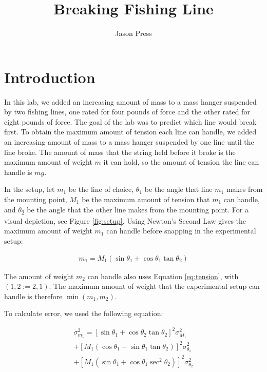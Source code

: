 \documentclass[12pt]{article}
\author{Jason Press}
\date{}
\title{Breaking Fishing Line}
\begin{document}
\maketitle
\section{Introduction}
\label{sec:orgcb4995c}

In this lab, we added an increasing amount of mass to a mass hanger suspended by two fishing lines, one rated for four pounds of force and the other rated for eight pounds of force. The goal of the lab was to predict which line would break first. To obtain the maximum amount of tension each line can handle, we added an increasing amount of mass to a mass hanger suspended by one line until the line broke. The amount of mass that the string held before it broke is the maximum amount of weight \(m\) it can hold, so the amount of tension the line can handle is \(mg\).

In the setup, let \(m_1\) be the line of choice, \(\theta_1\) be the angle that line \(m_1\) makes from the mounting point, \(M_1\) be the maximum amount of tension that \(m_1\) can handle, and \(\theta\)\textsubscript{2} be the angle that the other line makes from the mounting point. For a visual depiction, see Figure \ref{fig:setup}. Using Newton's Second Law gives the maximum amount of weight \(m_1\) can handle before snapping in the experimental setup:

\begin{align}\label{eq:tension}
m_{1} = M_{1} \left( \sin\theta_1 + \cos\theta_1\tan\theta_2 \right)
\end{align}

The amount of weight \(m_2\) can handle also uses Equation \ref{eq:tension}, with \((1,2 := 2,1)\). The maximum amount of weight that the experimental setup can handle is therefore \(\min(m_{1}, m_{2})\).

To calculate error, we used the following equation:

\begin{equation}
\begin{aligned} \label{eq:error}
\sigma_{m_1}^2 = \left[ \sin\theta_1 + \cos\theta_2\tan\theta_2 \right]^2\sigma_{M_1}^2 \\
+ \left[ M_1 \left( \cos\theta_1 - \sin\theta_1\tan\theta_2 \right) \right]^2 \sigma_{\theta_1}^2 \\
+ \left[ M_1 \left( \sin\theta_1 + \cos\theta_1\sec^2\theta_2 \right) \right]^2 \sigma_{\theta_2}^{2}
\end{aligned}
\end{equation}
\end{document}
